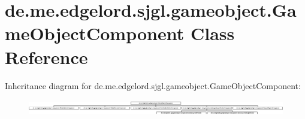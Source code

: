 \hypertarget{classde_1_1me_1_1edgelord_1_1sjgl_1_1gameobject_1_1_game_object_component}{}\section{de.\+me.\+edgelord.\+sjgl.\+gameobject.\+Game\+Object\+Component Class Reference}
\label{classde_1_1me_1_1edgelord_1_1sjgl_1_1gameobject_1_1_game_object_component}
Inheritance diagram for de.\+me.\+edgelord.\+sjgl.\+gameobject.\+Game\+Object\+Component\+:\begin{figure}[H]
\begin{center}
\leavevmode
\includegraphics[height=0.708861cm]{classde_1_1me_1_1edgelord_1_1sjgl_1_1gameobject_1_1_game_object_component}
\end{center}
\end{figure}

